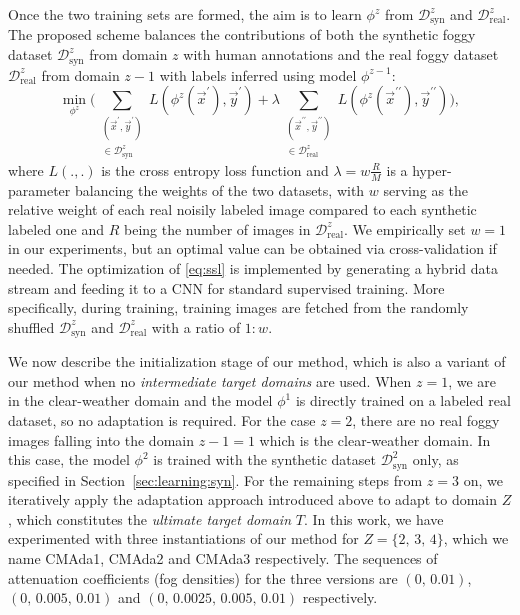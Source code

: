 \documentclass[twocolumn]{svjour3}          \smartqed  \usepackage{graphicx}
\begin{document}
Once the two training sets are formed, the aim is to learn $\phi^z$ from $\mathcal{D}_{\text{syn}}^z$ and $\mathcal{D}_{\text{real}}^z$. The proposed scheme balances the contributions of both the synthetic foggy dataset $\mathcal{D}_{\text{syn}}^z$ from domain $z$ with human annotations and the real foggy dataset $\mathcal{D}_{\text{real}}^z$ from domain $z-1$ with labels inferred using model $\phi^{z-1}$:
\begin{equation}
\label{eq:ssl}
\min_{\phi^z}  \bigg(\sum_{\substack{(\vec{x}^\prime, \vec{y}^\prime)  \\ \in \mathcal{D}_{\text{syn}}^z}} L(\phi^z(\vec{x}^\prime),\vec{y}^\prime)  +  \lambda  \sum_{\substack{(\vec{x}^{\prime \prime}, \vec{y}^{\prime \prime}) \\ \in \mathcal{D}_{\text{real}}^z}} L(\phi^z(\vec{x}^{\prime \prime}),\vec{y}^{\prime \prime}) \bigg),
\end{equation}
where $L(.,.)$ is the cross entropy loss function and $\lambda=w\frac{R}{M}$ is a hyper-parameter balancing the weights of the two datasets, with $w$ serving as the relative weight of each real noisily labeled image compared to each synthetic labeled one and $R$ being the number of images in $\mathcal{D}_{\text{real}}^z$. We empirically set $w=1$ in our experiments, but an optimal value can be obtained via cross-validation if needed. The optimization of \eqref{eq:ssl} is implemented by generating a hybrid data stream and feeding it to a CNN for standard supervised training. More specifically, during training, training images are fetched from the randomly shuffled $\mathcal{D}_{\text{syn}}^z$ and $\mathcal{D}_{\text{real}}^z$ with a ratio  of $1:w$.   

We now describe the initialization stage of our method, which is also a variant of our method when no \emph{intermediate target domains} are used.
When $z=1$, we are in the clear-weather domain and the model $\phi^1$ is directly trained on a labeled real dataset, so no adaptation is required. For the case $z=2$, there are no real foggy images falling into the domain $z-1=1$ which is the clear-weather domain. In this case, the model $\phi^2$ is trained with the synthetic dataset $\mathcal{D}_{\text{syn}}^2$ only, as specified in Section~\ref{sec:learning:syn}. For the remaining steps from $z=3$ on, we iteratively apply the adaptation approach introduced above to adapt to domain $Z$, which constitutes the \emph{ultimate target domain} $T$.
In this work, we have experimented with three instantiations of our method for $Z=\{2,\,3,\,4\}$, which we name CMAda1, CMAda2 and CMAda3 respectively. The sequences of attenuation coefficients (fog densities) for the three versions are $(0,\,0.01)$, $(0,\,0.005,\,0.01)$ and $(0,\,0.0025,\,0.005,\,0.01)$ respectively.
\end{document}

